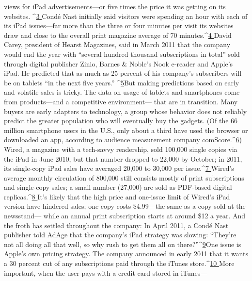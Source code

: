 views for iPad advertisements—or five times the price it was getting on its websites.
^{\href{#endnotes-ch4}{3 }}Condé Nast initially said visitors were spending an hour with each of its
iPad issues—far more than the three or four minutes per visit its websites draw
and close to the overall print magazine average of 70 minutes.^{\href{#endnotes-ch4}{4 }}David Carey, president
of Hearst Magazines, said in March 2011 that the company would end the
year with ``several hundred thousand subscriptions in total'' sold through digital
publisher Zinio, Barnes & Noble’s Nook e-reader and Apple’s iPad. He predicted
that as much as 25 percent of his company’s subscribers will be on tablets ``in the
next five years.'' ^{\href{#endnotes-ch4}{5}}But making predictions based on early and volatile sales is tricky. The data on
usage of tablets and smartphones come from products—and a competitive environment—
that are in transition. Many buyers are early adapters to technology, a
group whose behavior does not reliably predict the greater population who will
eventually buy the gadgets. (Of the 66 million smartphone users in the U.S., only
about a third have used the browser or downloaded an app, according to audience
measurement company comScore.^{\href{#endnotes-ch4}{6}})
Wired, a magazine with a tech-savvy readership, sold 100,000 single copies via
the iPad in June 2010, but that number dropped to 22,000 by October; in 2011,
its single-copy iPad sales have averaged 20,000 to 30,000 per issue.^{\href{#endnotes-ch4}{7 }}Wired’s average
monthly circulation of 800,000 still consists mostly of print subscriptions
and single-copy sales; a small number (27,000) are sold as PDF-based digital
replicas.^{\href{#endnotes-ch4}{8 }}It’s likely that the high price and one-issue limit of Wired’s iPad version
have hindered sales; one copy costs \$4.99—the same as a copy sold at the newsstand—
while an annual print subscription starts at around \$12 a year. And the
froth has settled throughout the company: In April 2011, a Condé Nast publisher
told AdAge that the company’s iPad strategy was slowing: ``They’re not all doing
all that well, so why rush to get them all on there?''^{\href{#endnotes-ch4}{9}}One issue is Apple’s own pricing strategy. The company announced in early
2011 that it wants a 30 percent cut of any subscriptions paid through the iTunes
store.^{\href{#endnotes-ch4}{10 }}More important, when the user pays with a credit card stored in iTunes—

